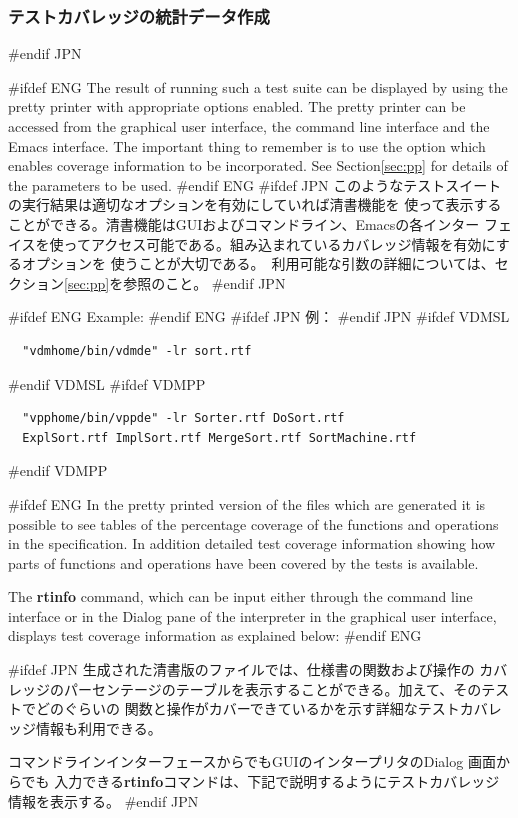 \documentclass[\pformat,12pt]{article}
\newcommand{\guicmd}[1]{{\sf #1}}
\newcommand{\guicmd}[1]{{\gt #1}}
\begin{document}
\subsubsection{テストカバレッジの統計データ作成}
#endif JPN

#ifdef ENG
The result of running such a test suite can be displayed by using the
pretty printer with appropriate options enabled.  The pretty printer
can be accessed from the graphical user interface, the command
line interface and the Emacs interface. The important thing to
remember is to use the option which enables coverage information to be
incorporated. See Section\ref{sec:pp} for details of the
parameters to be used.
#endif ENG
#ifdef JPN
このようなテストスイートの実行結果は適切なオプションを有効にしていれば清書機能を
使って表示することができる。清書機能はGUIおよびコマンドライン、Emacsの各インター
フェイスを使ってアクセス可能である。組み込まれているカバレッジ情報を有効にするオプションを
使うことが大切である。　利用可能な引数の詳細については、セクション\ref{sec:pp}を参照のこと。
#endif JPN

#ifdef ENG
Example:
#endif ENG
#ifdef JPN
例：
#endif JPN
#ifdef VDMSL
\begin{verbatim}
  "vdmhome/bin/vdmde" -lr sort.rtf
\end{verbatim}
#endif VDMSL
#ifdef VDMPP
\begin{verbatim}
  "vpphome/bin/vppde" -lr Sorter.rtf DoSort.rtf
  ExplSort.rtf ImplSort.rtf MergeSort.rtf SortMachine.rtf
\end{verbatim}
#endif VDMPP

#ifdef ENG
In the pretty printed version of the files which are generated it is
possible to see tables of the percentage coverage of the functions
and operations in the specification. In addition detailed test
coverage information showing how parts of functions and operations
have been covered by the tests is available.

The \textbf{rtinfo} command, which can be input either through the command
line interface or in the \guicmd{Dialog} pane of the interpreter in  the
graphical user interface, displays test coverage information as
explained below:
#endif ENG

#ifdef JPN
生成された清書版のファイルでは、仕様書の関数および操作の
カバレッジのパーセンテージのテーブルを表示することができる。加えて、そのテストでどのぐらいの
関数と操作がカバーできているかを示す詳細なテストカバレッジ情報も利用できる。

コマンドラインインターフェースからでもGUIのインタープリタの\guicmd{Dialog} 画面からでも
入力できる\textbf{rtinfo}コマンドは、下記で説明するようにテストカバレッジ情報を表示する。
#endif JPN
\end{document}
